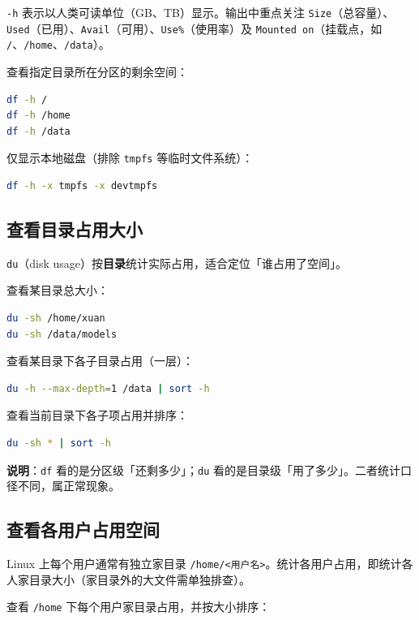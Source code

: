 \texttt{-h} 表示以人类可读单位（GB、TB）显示。输出中重点关注 \texttt{Size}（总容量）、\texttt{Used}（已用）、\texttt{Avail}（可用）、\texttt{Use\%}（使用率）及 \texttt{Mounted on}（挂载点，如 \texttt{/}、\texttt{/home}、\texttt{/data}）。

查看指定目录所在分区的剩余空间：

\begin{lstlisting}[language=sh]
df -h /
df -h /home
df -h /data
\end{lstlisting}

仅显示本地磁盘（排除 \texttt{tmpfs} 等临时文件系统）：

\begin{lstlisting}[language=sh]
df -h -x tmpfs -x devtmpfs
\end{lstlisting}

\subsection{查看目录占用大小}

\texttt{du}（disk usage）按\textbf{目录}统计实际占用，适合定位「谁占用了空间」。

查看某目录总大小：

\begin{lstlisting}[language=sh]
du -sh /home/xuan
du -sh /data/models
\end{lstlisting}

查看某目录下各子目录占用（一层）：

\begin{lstlisting}[language=sh]
du -h --max-depth=1 /data | sort -h
\end{lstlisting}

查看当前目录下各子项占用并排序：

\begin{lstlisting}[language=sh]
du -sh * | sort -h
\end{lstlisting}

\textbf{说明}：\texttt{df} 看的是分区级「还剩多少」；\texttt{du} 看的是目录级「用了多少」。二者统计口径不同，属正常现象。

\subsection{查看各用户占用空间}

Linux 上每个用户通常有独立家目录 \texttt{/home/<用户名>}。统计各用户占用，即统计各人家目录大小（家目录外的大文件需单独排查）。

查看 \texttt{/home} 下每个用户家目录占用，并按大小排序：

